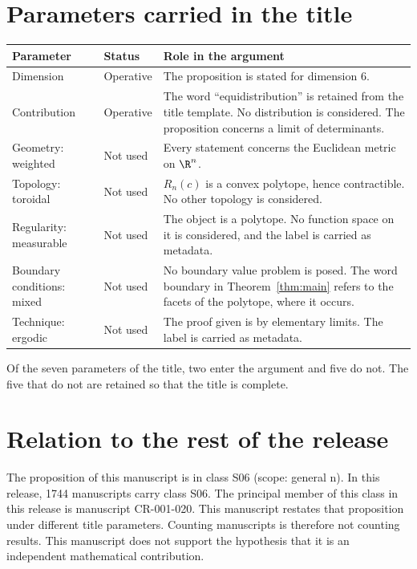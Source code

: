 \documentclass[11pt]{article}
\begin{document}
\section{Parameters carried in the title}\label{sec:params}
\begin{center}
\small
\begin{tabular}{p{}p{}p{}}
\toprule
Parameter & Status & Role in the argument \\
\midrule
Dimension & Operative & The proposition is stated for dimension $6$. \\
Contribution & Operative & The word ``equidistribution'' is retained from the title template. No distribution is considered. The proposition concerns a limit of determinants. \\
Geometry: weighted & Not used & Every statement concerns the Euclidean metric on $\R^n$. \\
Topology: toroidal & Not used & $R_n(c)$ is a convex polytope, hence contractible. No other topology is considered. \\
Regularity: measurable & Not used & The object is a polytope. No function space on it is considered, and the label is carried as metadata. \\
Boundary conditions: mixed & Not used & No boundary value problem is posed. The word boundary in Theorem~\ref{thm:main} refers to the facets of the polytope, where it occurs. \\
Technique: ergodic & Not used & The proof given is by elementary limits. The label is carried as metadata. \\
\bottomrule
\end{tabular}
\end{center}
Of the seven parameters of the title, two enter the argument and five do not. The five that do not are retained so that the title is complete.

\section{Relation to the rest of the release}
The proposition of this manuscript is in class S06 (scope: general n).
In this release, 1744 manuscripts carry class S06. The principal member of this class in this release is manuscript CR-001-020. This manuscript restates that proposition under different title parameters.
Counting manuscripts is therefore not counting results. This manuscript does not support the hypothesis that it is an independent mathematical contribution.
\end{document}

